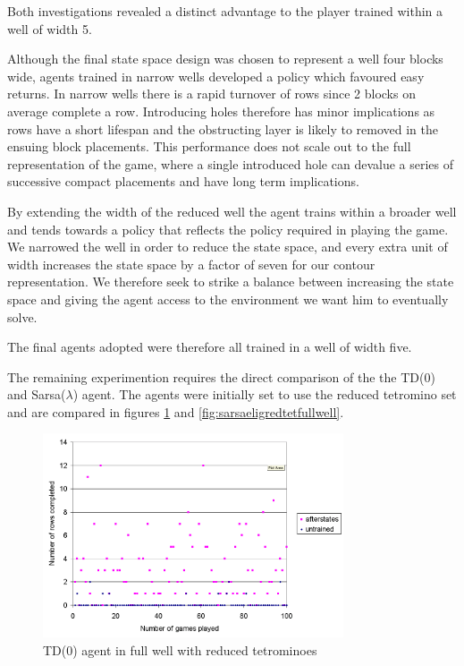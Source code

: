\documentclass{rucsthesis}
\begin{document}
Both investigations revealed a distinct advantage to the player trained within a well of width 5.

Although the final state space design was chosen to represent a well four blocks wide, agents trained in narrow wells developed a policy which favoured easy returns. In narrow wells there is a rapid turnover of rows since 2 blocks on average complete a row. Introducing holes therefore has minor implications as rows have a short lifespan and the obstructing layer is likely to removed in the ensuing block placements. This performance does not scale out to the full representation of the game, where a single introduced hole can devalue a series of successive compact placements and have long term implications.

By extending the width of the reduced well the agent trains within a broader well and tends towards a policy that reflects the policy required in playing the game. We narrowed the well in order to reduce the state space, and every extra unit of width increases the state space by a factor of seven for our contour representation. We therefore seek to strike a balance between increasing the state space and giving the agent access to the environment we want him to eventually solve.

The final agents adopted were therefore all trained in a well of width five.

The remaining experimention requires the direct comparison of the the TD(0) and Sarsa($\lambda$) agent. The agents were initially set to use the reduced tetromino set and are compared in figures \ref{fig:afterstatesredtetfullwell} and \ref{fig:sarsaeligredtetfullwell}.

\begin{figure}[h]
\centering
\includegraphics[width=3.5in]{afterstatesredtetfullwell.png}
\caption{TD(0) agent in full well with reduced tetrominoes}
\label{fig:afterstatesredtetfullwell}
\end{figure}
\end{document}
